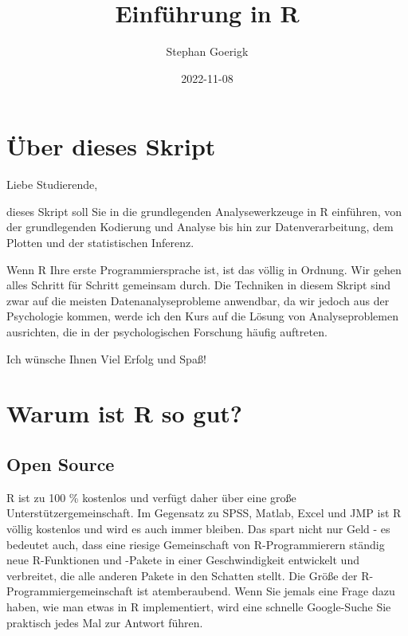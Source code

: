 \documentclass[
]{book}
\title{Einführung in R}
\author{Stephan Goerigk}
\date{2022-11-08}
\begin{document}
\maketitle

{
\setcounter{tocdepth}{1}
\tableofcontents
}
\hypertarget{uxfcber-dieses-skript}{%
\chapter*{Über dieses Skript}\label{uxfcber-dieses-skript}}

Liebe Studierende,

dieses Skript soll Sie in die grundlegenden Analysewerkzeuge in R einführen, von der grundlegenden Kodierung und Analyse bis hin zur Datenverarbeitung, dem Plotten und der statistischen Inferenz.

Wenn R Ihre erste Programmiersprache ist, ist das völlig in Ordnung. Wir gehen alles Schritt für Schritt gemeinsam durch. Die Techniken in diesem Skript sind zwar auf die meisten Datenanalyseprobleme anwendbar, da wir jedoch aus der Psychologie kommen, werde ich den Kurs auf die Lösung von Analyseproblemen ausrichten, die in der psychologischen Forschung häufig auftreten.

Ich wünsche Ihnen Viel Erfolg und Spaß!

\hypertarget{warum-ist-r-so-gut}{%
\chapter{Warum ist R so gut?}\label{warum-ist-r-so-gut}}

\hypertarget{open-source}{%
\section{Open Source}\label{open-source}}

R ist zu 100 \% kostenlos und verfügt daher über eine große Unterstützergemeinschaft. Im Gegensatz zu SPSS, Matlab, Excel und JMP ist R völlig kostenlos und wird es auch immer bleiben. Das spart nicht nur Geld - es bedeutet auch, dass eine riesige Gemeinschaft von R-Programmierern ständig neue R-Funktionen und -Pakete in einer Geschwindigkeit entwickelt und verbreitet, die alle anderen Pakete in den Schatten stellt. Die Größe der R-Programmiergemeinschaft ist atemberaubend. Wenn Sie jemals eine Frage dazu haben, wie man etwas in R implementiert, wird eine schnelle Google-Suche Sie praktisch jedes Mal zur Antwort führen.
\end{document}

